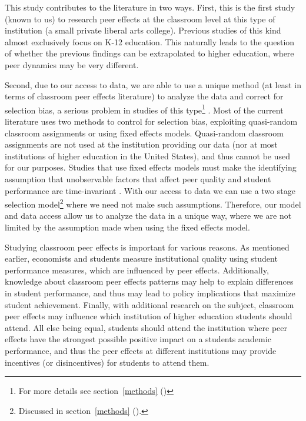 \documentclass[12pt,letterpaper,english,fleqn]{article}
\newcommand{\sectlabel}[1]{section~\ref{#1} (\nameref{#1})}
\begin{document}
This study contributes to the literature in two ways.
First, this is the first study (known to us) to research peer effects at the classroom level at this type of institution (a small private liberal arts college). 
Previous studies of this kind  almost exclusively focus on K-12 education. 
This naturally leads to the question of whether the previous findings can be extrapolated to higher education, where peer dynamics may be very different. 

Second, due to our access to data, we are able to use a unique method (at least in terms of classroom peer effects literature) to analyze the data and correct for selection bias, a serious problem in studies of this type\footnote{For more details see \sectlabel{methods}} \citep{carman2012classroom,burke2013classroom,ding2007peers}. 
Most of the current literature uses two methods to control for selection bias, exploiting quasi-random classroom assignments or using fixed effects models.
Quasi-random classroom assignments are not used at the institution providing our data (nor at most institutions of higher education in the United States), and thus cannot be used for our purposes. 
Studies that use fixed effects models must make the identifying assumption that unobservable factors that affect peer quality and student performance are time-invariant \citep{lavy2012good}. 
With our access to data we can use a two stage selection model\footnote{Discussed in \sectlabel{methods}.} where we need not make such assumptions. 
Therefore, our model and data access allow us to analyze the data in a unique way, where we are not limited by the assumption made when using the fixed effects model. 

Studying classroom peer effects is important for various reasons. 
As mentioned earlier, economists and students measure institutional quality using student performance measures, which are influenced by peer effects. 
Additionally, knowledge about classroom peer effects patterns may help to explain differences in student performance, and thus may lead to policy implications that maximize student achievement. 
Finally, with additional research on the subject, classroom peer effects may influence which institution of higher education students should attend. 
All else being equal, students should attend the institution where peer effects have the strongest possible positive impact on a students academic performance, and thus the peer effects at different institutions may provide incentives (or disincentives) for students to attend them. 
\end{document}
